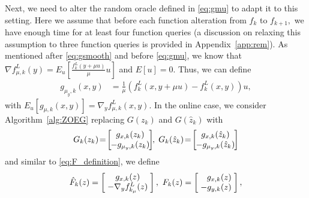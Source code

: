 \documentclass{article}
\theoremstyle{plain}
\theoremstyle{definition}
\theoremstyle{remark}
\begin{document}
Next, we need to alter the random oracle defined in \eqref{eq:gmu} to adapt it to this setting. Here we assume that before each function alteration from $f_k$ to $f_{k+1},$ we have enough time for at least four function queries (a discussion on relaxing this assumption to three function queries is provided in Appendix~\ref{app:rem}).  As mentioned after \eqref{eq:gsmooth} and before \eqref{eq:gmu}, 
we know that $\nabla f^L_{\mu,k}(y) = E_u[\frac{f^L_{k}(y+\mu u)}{\mu}u]$ and $E[u]=0.$ Thus, we can define 
\begin{align}\label{eq:gon1}
    g_{\mu_y,k}(x,y) &= \tfrac{1}{\mu} (f^L_{k}(x,y+\mu u)-f^L_{k}(x,y)) u, 
\end{align}
with
$E_u[g_{\mu,k}(x,y)]=\nabla_y f^L_{\mu,k}(x,y).$ In the online case, we consider Algorithm~\ref{alg:ZOEG} replacing $G(z_k)$ and $G(\hat{z}_k)$ with 
\begin{align}
    G_k(z_k)\!=\!\left[ \hspace{-0.2cm} \begin{array}{c}
         g_{x,k}(z_k)\\ 
         -g_{\mu_y,k}(z_k)
    \end{array} \hspace{-0.2cm} \right]\hspace{-0.1cm},\; G_{k}(\hat{z}_k)\!=\!\left[ \hspace{-0.2cm} \begin{array}{c}
         g_{x,k}(\hat{z}_k)\\ 
         -g_{\mu_y,k}(\hat{z}_k)
    \end{array} \hspace{-0.2cm} \right]
\end{align}
and similar to \eqref{eq:F_definition}, we define
\begin{align}
    \hat{F}_k(z)=\left[ \hspace{-0.075cm} \begin{array}{c}
         g_{x,k}(z)  \\
         -\nabla_y f_{k_\mu}^L(z) 
    \end{array} \hspace{-0.075cm} \right],  \ 
    F_k(z)=\left[ \hspace{-0.075cm} \begin{array}{r}
         g_{x,k}(z)\\ 
         -g_{y,k}(z)
    \end{array} \hspace{-0.075cm} \right], \label{eq:Fk_definition}
\end{align}
\end{document}
